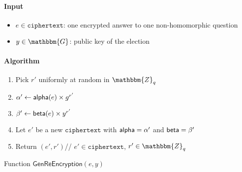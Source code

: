 \documentclass[a4paper]{article}
\newcommand{\G}{\mathbbm{G}}
\newcommand{\Z}{\mathbbm{Z}}
\begin{document}
\begin{table}
  \begin{framed}
    \noindent\paragraph{Input}
    \begin{itemize}
    \item $e\in\texttt{ciphertext}$: one encrypted answer to one
      non-homomorphic question
    \item $y\in\G$: public key of the election
    \end{itemize}
    \noindent\paragraph{Algorithm}
    \begin{enumerate}
    \item Pick $r'$ uniformly at random in $\Z_q$
    \item $\alpha'\leftarrow\textsf{alpha}(e)\times g^{r'}$
    \item $\beta'\leftarrow\textsf{beta}(e)\times y^{r'}$
    \item Let $e'$ be a new $\texttt{ciphertext}$ with
      $\textsf{alpha}=\alpha'$ and $\textsf{beta}=\beta'$
    \item Return $(e',r')$\hfill// $e'\in\texttt{ciphertext}$,
      $r'\in\Z_q$
    \end{enumerate}
  \end{framed}
  \caption{Function $\mathsf{GenReEncryption}(e,y)$}
  \label{gen-re-encryption}
\end{table}
\end{document}
